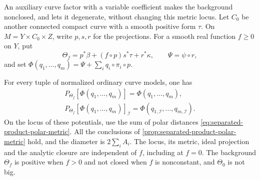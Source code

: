 An auxiliary curve factor with a variable coefficient makes the background nonclosed, and lets it degenerate, without changing this metric locus. Let $C_0$ be another connected compact curve with a smooth positive form $\tau$. On $M=Y\times C_0\times Z$, write $p,s,r$ for the projections. For a smooth real function $f\geq0$ on $Y$, put
\[
 \Theta_f=p^*\beta+(f\circ p)s^*\tau+r^*\kappa,
 \qquad \Psi=\psi\circ r,
\]
and set $\Phi(q_1,\ldots,q_m)=\Psi+\sum_iq_i\circ\pi_i\circ p$.

\begin{corollary}\label{cor:nonclosed-separated-product-metric}\label{cor:nonclosed-product-polar-metric}\label{cor:degenerate-product-polar-metric}
For every tuple of normalized ordinary curve models, one has
\[
 \begin{gathered}
 P_{\Theta_f}[\Phi(q_1,\ldots,q_m)]=\Phi(q_1,\ldots,q_m),\\
 P_{\Theta_f}[\Phi(q_1,\ldots,q_m)]_{\mathcal I}
       =\Phi(q_{1,\mathcal I},\ldots,q_{m,\mathcal I}).
 \end{gathered}
\]
On the locus of these potentials, use the sum of polar distances \eqref{eq:separated-product-polar-metric}. All the conclusions of \cref{prop:separated-product-polar-metric} hold, and the diameter is $2\sum_i A_i$. The locus, its metric, ideal projection and the analytic closure are independent of $f$, including at $f=0$. The background $\Theta_f$ is positive when $f>0$ and not closed when $f$ is nonconstant, and $\Theta_0$ is not big.
\end{corollary}
